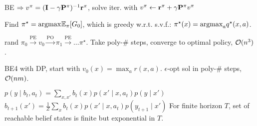 \begin{definition}
    BE \(\Rightarrow v^\pi = (\vb{I} - \gamma \vb{P}^\pi)^{-1}\vb{r}^\pi\), solve iter. with \(v^\pi \leftarrow \vb{r}^\pi + \gamma \vb{P}^\pi v^\pi\)
\end{definition}

\begin{definition}
    Find \(\pi^\star = \text{argmax}_{}\mathbb{E}_{\pi}[G_0]\), which is greedy w.r.t. s.v.f.: \(\pi^\star(x) = \text{argmax}_{a} q^\star(x, a)\).
\end{definition}

\begin{definition}[PI]
    rand \(\pi_0 \overset{\text{PE}}{\to} v_0 \overset{\text{PO}}{\to} \pi_1 \overset{\text{PE}}{\to} \ldots \pi^\star\). Take poly-\# steps, converge to optimal policy, \(\mathcal{O}(n^3)\).
\end{definition}

\begin{definition}[VI]
    BE4 with DP, start with \(v_0(x) = \max_a r(x, a)\).
    \(\epsilon\)-opt sol in poly-\# steps, \(\mathcal{O}(nm)\).
\end{definition}

\begin{definition}[POMDP]
    \(p(y \mid b_t, a_t) = \sum_{x, x'}b_t(x) p(x' \mid x, a_t)p(y \mid x')\)
    \(b_{t+1}(x') = \frac{1}{Z} \sum_x b_t(x)p(x' \mid x, a_t)p(y_{t+1} \mid x')\)
    For finite horizon \(T\), set of reachable belief states is finite but exponential in \(T\).
\end{definition}